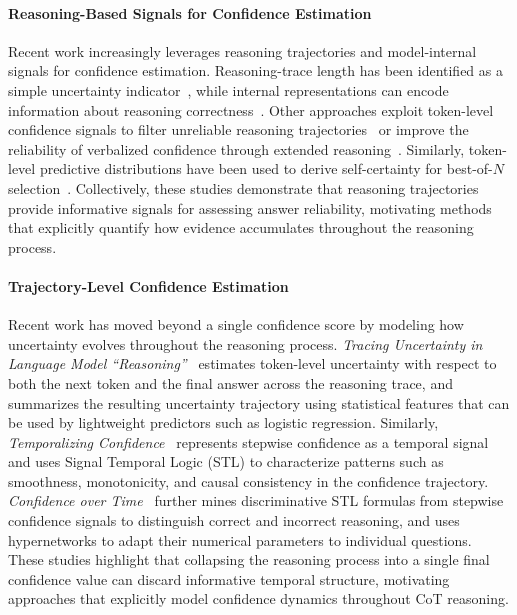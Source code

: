 \documentclass{article} %
\begin{document}
\paragraph{Reasoning-Based Signals for Confidence Estimation}
Recent work increasingly leverages reasoning trajectories and model-internal signals for confidence estimation. Reasoning-trace length has been identified as a simple uncertainty indicator~\cite{devic2025trace}, while internal representations can encode information about reasoning correctness~\cite{chen2026deep}. Other approaches exploit token-level confidence signals to filter unreliable reasoning trajectories~\cite{fu2026deepconf} or improve the reliability of verbalized confidence through extended reasoning~\cite{podolak2025read}. Similarly, token-level predictive distributions have been used to derive self-certainty for best-of-$N$ selection~\cite{kang2025selfcertainty}. Collectively, these studies demonstrate that reasoning trajectories provide informative signals for assessing answer reliability, motivating methods that explicitly quantify how evidence accumulates throughout the reasoning process.


\paragraph{Trajectory-Level Confidence Estimation}
Recent work has moved beyond a single confidence score by modeling how uncertainty evolves throughout the reasoning process. \emph{Tracing Uncertainty in Language Model ``Reasoning''}~\cite{grunefeld2026tracing} estimates token-level uncertainty with respect to both the next token and the final answer across the reasoning trace, and summarizes the resulting uncertainty trajectory using statistical features that can be used by lightweight predictors such as logistic regression. Similarly, \emph{Temporalizing Confidence}~\cite{mao-etal-2025-temporalizing} represents stepwise confidence as a temporal signal and uses Signal Temporal Logic (STL) to characterize patterns such as smoothness, monotonicity, and causal consistency in the confidence trajectory. \emph{Confidence over Time}~\cite{mao-etal-2026-confidence} further mines discriminative STL formulas from stepwise confidence signals to distinguish correct and incorrect reasoning, and uses hypernetworks to adapt their numerical parameters to individual questions. These studies highlight that collapsing the reasoning process into a single final confidence value can discard informative temporal structure, motivating approaches that explicitly model confidence dynamics throughout CoT reasoning.
\end{document}
